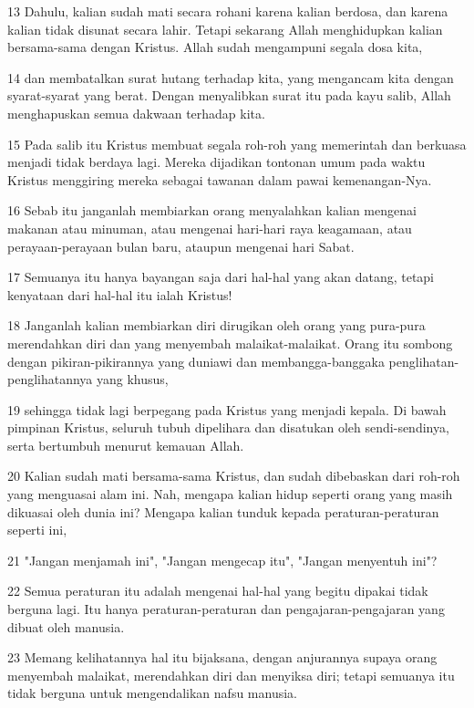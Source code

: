 \par 13 Dahulu, kalian sudah mati secara rohani karena kalian berdosa, dan karena kalian tidak disunat secara lahir. Tetapi sekarang Allah menghidupkan kalian bersama-sama dengan Kristus. Allah sudah mengampuni segala dosa kita,
\par 14 dan membatalkan surat hutang terhadap kita, yang mengancam kita dengan syarat-syarat yang berat. Dengan menyalibkan surat itu pada kayu salib, Allah menghapuskan semua dakwaan terhadap kita.
\par 15 Pada salib itu Kristus membuat segala roh-roh yang memerintah dan berkuasa menjadi tidak berdaya lagi. Mereka dijadikan tontonan umum pada waktu Kristus menggiring mereka sebagai tawanan dalam pawai kemenangan-Nya.
\par 16 Sebab itu janganlah membiarkan orang menyalahkan kalian mengenai makanan atau minuman, atau mengenai hari-hari raya keagamaan, atau perayaan-perayaan bulan baru, ataupun mengenai hari Sabat.
\par 17 Semuanya itu hanya bayangan saja dari hal-hal yang akan datang, tetapi kenyataan dari hal-hal itu ialah Kristus!
\par 18 Janganlah kalian membiarkan diri dirugikan oleh orang yang pura-pura merendahkan diri dan yang menyembah malaikat-malaikat. Orang itu sombong dengan pikiran-pikirannya yang duniawi dan membangga-banggaka penglihatan-penglihatannya yang khusus,
\par 19 sehingga tidak lagi berpegang pada Kristus yang menjadi kepala. Di bawah pimpinan Kristus, seluruh tubuh dipelihara dan disatukan oleh sendi-sendinya, serta bertumbuh menurut kemauan Allah.
\par 20 Kalian sudah mati bersama-sama Kristus, dan sudah dibebaskan dari roh-roh yang menguasai alam ini. Nah, mengapa kalian hidup seperti orang yang masih dikuasai oleh dunia ini? Mengapa kalian tunduk kepada peraturan-peraturan seperti ini,
\par 21 "Jangan menjamah ini", "Jangan mengecap itu", "Jangan menyentuh ini"?
\par 22 Semua peraturan itu adalah mengenai hal-hal yang begitu dipakai tidak berguna lagi. Itu hanya peraturan-peraturan dan pengajaran-pengajaran yang dibuat oleh manusia.
\par 23 Memang kelihatannya hal itu bijaksana, dengan anjurannya supaya orang menyembah malaikat, merendahkan diri dan menyiksa diri; tetapi semuanya itu tidak berguna untuk mengendalikan nafsu manusia.

